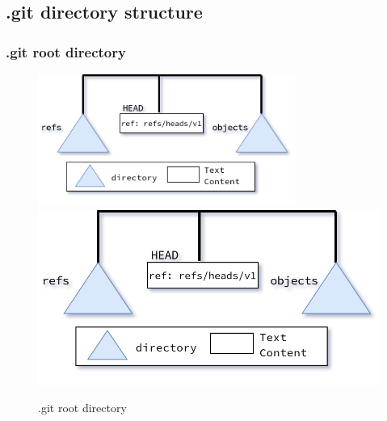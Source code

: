 \subsection{.git directory structure}
\begin{frame}[fragile]
    \frametitle{.git root directory}
    \begin{figure}
        \begin{center}
            {
                \includegraphics[width=0.75\textwidth,keepaspectratio]{./images/gitDirectory-Root.png}
            }
            {
                \includegraphics[height=0.75\textheight,keepaspectratio]{./images/gitDirectory-Root.png}
            }
            \caption{.git root directory}
        \end{center}
    \end{figure}
\end{frame}


